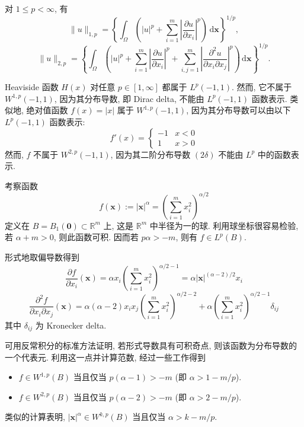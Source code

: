 \begin{Example}
\label{ex:sobolev-first-second-norms}
对 $1\leq p<\infty$, 有\[
\|u\|_{1,p}=\left\{\int_{\Omega}\left(|u|^p+\sum_{i=1}^m\left|\dfrac{\partial u}{\partial x_i}\right|^p\right)\,\mathrm{d}\bm{x}\right\}^{1/p},
\]
\[
\|u\|_{2,p}=\left\{\int_{\Omega}\left(|u|^p+\sum_{i=1}^m\left|\dfrac{\partial u}{\partial x_i}\right|^p+\sum_{i,j=1}^m\left|\dfrac{\partial^2u}{\partial x_i\partial x_j}\right|^p\right)\,\mathrm{d}\bm{x}\right\}^{1/p}.
\]
\end{Example}

\begin{Example}
\label{ex:heaviside-absolute-value-sobolev-membership}
Heaviside 函数 $H(x)$ 对任意 $p\in[1,\infty]$ 都属于 $L^p(-1,1)$. 然而, 它不属于 $W^{1,p}(-1,1)$, 因为其分布导数, 即 Dirac delta, 不能由 $L^p(-1,1)$ 函数表示. 类似地, 绝对值函数 $f(x)=|x|$ 属于 $W^{1,p}(-1,1)$, 因为其分布导数可以由以下 $L^p(-1,1)$ 函数表示:\[f'(x)=\begin{cases}-1&x<0\\1&x>0\end{cases}\]然而, $f$ 不属于 $W^{2,p}(-1,1)$, 因为其二阶分布导数 $(2\delta)$ 不能由 $L^p$ 中的函数表示.
\end{Example}

\begin{Example}
\label{ex:radial-power-sobolev-membership}
考察函数\[f(\bm{x}):=|\bm{x}|^{\alpha}=\left(\sum_{i=1}^m x_i^2\right)^{\alpha/2}\]定义在 $B=B_1(\bm{0})\subset\mathbb{R}^m$ 上, 这是 $\mathbb{R}^m$ 中半径为一的球. 利用球坐标很容易检验, 若 $\alpha+m>0$, 则此函数可积. 因而若 $p\alpha>-m$, 则有 $f\in L^p(B)$.

形式地取偏导数得到\[\dfrac{\partial f}{\partial x_i}(\bm{x})=\alpha x_i\left(\sum_{i=1}^m x_i^2\right)^{\alpha/2-1}=\alpha|\bm{x}|^{(\alpha-2)/2}x_i\]\[
\dfrac{\partial^2f}{\partial x_i\partial x_j}(\bm{x})=\alpha(\alpha-2)x_ix_j\left(\sum_{i=1}^m x_i^2\right)^{\alpha/2-2}+\alpha\left(\sum_{i=1}^m x_i^2\right)^{\alpha/2-1}\delta_{ij}
\]其中 $\delta_{ij}$ 为 Kronecker delta.

可用反常积分的标准方法证明, 若形式导数具有可积奇点, 则该函数为分布导数的一个代表元. 利用这一点并计算范数, 经过一些工作得到\begin{itemize}
\item $f\in W^{1,p}(B)$ 当且仅当 $p(\alpha-1)>-m$ (即 $\alpha>1-m/p$).
\item $f\in W^{2,p}(B)$ 当且仅当 $p(\alpha-2)>-m$ (即 $\alpha>2-m/p$).
\end{itemize}类似的计算表明, $|\bm{x}|^{\alpha}\in W^{k,p}(B)$ 当且仅当 $\alpha>k-m/p$.
\end{Example}
